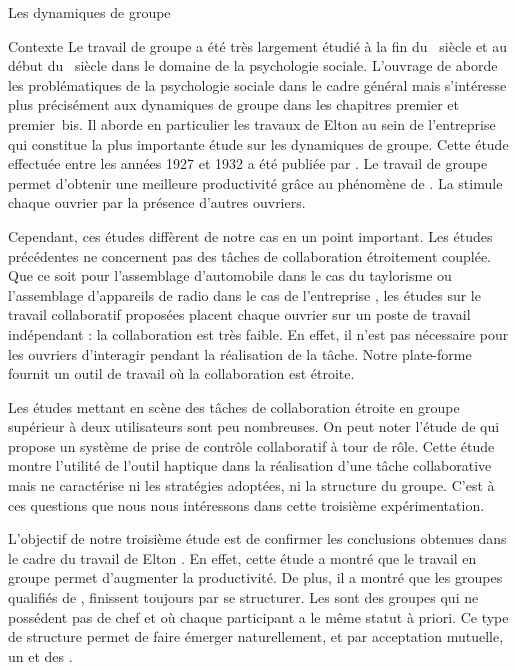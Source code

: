 \documentclass[myfrancais]{mythesis}
\begin{document}
\begin{mychapter}{Les dynamiques de groupe}
\begin{mysection}{Contexte}
			Le travail de groupe a été très largement étudié à la fin du ~siècle et au début du ~siècle dans le domaine de la psychologie sociale.
			L'ouvrage de  aborde les problématiques de la psychologie sociale dans le cadre général mais s'intéresse plus précisément aux dynamiques de groupe dans les chapitres premier et premier~bis.
			Il aborde en particulier les travaux de Elton  au sein de l'entreprise \myHawthorne qui constitue la plus importante étude sur les dynamiques de groupe.
			Cette étude effectuée entre les années 1927 et 1932 a été publiée par .
			Le travail de groupe permet d'obtenir une meilleure productivité grâce au phénomène de .
			La  stimule chaque ouvrier par la présence d'autres ouvriers.

			Cependant, ces études diffèrent de notre cas en un point important.
			Les études précédentes ne concernent pas des tâches de collaboration étroitement couplée.
			Que ce soit pour l'assemblage d'automobile dans le cas du taylorisme ou l'assemblage d'appareils de radio dans le cas de l'entreprise \myHawthorne, les études sur le travail collaboratif proposées placent chaque ouvrier sur un poste de travail indépendant : la collaboration est très faible.
			En effet, il n'est pas nécessaire pour les ouvriers d'interagir pendant la réalisation de la tâche.
			Notre plate-forme fournit un outil de travail où la collaboration est étroite.

			Les études mettant en scène des tâches de collaboration étroite en groupe supérieur à deux utilisateurs sont peu nombreuses.
			On peut noter l'étude de  qui propose un système de prise de contrôle collaboratif à tour de rôle.
			Cette étude montre l'utilité de l'outil haptique dans la réalisation d'une tâche collaborative mais ne caractérise ni les stratégies adoptées, ni la structure du groupe.
			C'est à ces questions que nous nous intéressons dans cette troisième expérimentation.

			L'objectif de notre troisième étude est de confirmer les conclusions obtenues dans le cadre du travail de Elton .
			En effet, cette étude a montré que le travail en groupe permet d'augmenter la productivité.
			De plus, il a montré que les groupes qualifiés de , finissent toujours par se structurer.
			Les  sont des groupes qui ne possédent pas de chef et où chaque participant a le même statut à priori.
			Ce type de structure permet de faire émerger naturellement, et par acceptation mutuelle, un  et des .


\end{mysection}
\end{mychapter}
\end{document}
